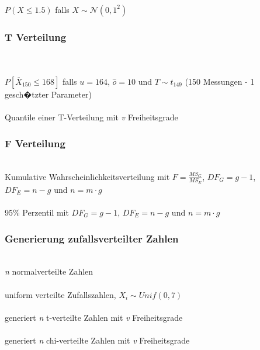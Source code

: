 \documentclass{article}
\begin{document}
\begin{multicols*}{3}
 \\
$P(X \leq 1.5)$ falls $X \sim \mathcal{N}(0, 1^2)$

\subsubsection*{T Verteilung}

 \\
 \\
$P[\overline{X}_{150} \leq 168]$ falls $u = 164$, $\hat{o} = 10$ und $T \sim t_{149}$ (150 Messungen - 1 gesch�tzter Parameter) \\

 \\
Quantile einer T-Verteilung mit \textit{v} Freiheitsgrade

\subsubsection*{F Verteilung}
\\
Kumulative Wahrscheinlichkeitsverteilung mit $F=\frac{MS_G}{MS_E}$, $DF_G = g - 1$, $DF_E = n - g$ und $n = m\cdot g$\\

\\
95\% Perzentil mit $DF_G = g - 1$, $DF_E = n - g$ und $n = m\cdot g$

\subsubsection*{Generierung zufallsverteilter Zahlen}

\\
\textit{n} normalverteilte Zahlen \\

 \\
uniform verteilte Zufallszahlen, $X_i \sim Unif(0, 7)$ \\

 \\
generiert \textit{n} t-verteilte Zahlen mit \textit{v} Freiheitsgrade \\

 \\
generiert \textit{n} chi-verteilte Zahlen mit \textit{v} Freiheitsgrade


\end{multicols*}
\end{document}

